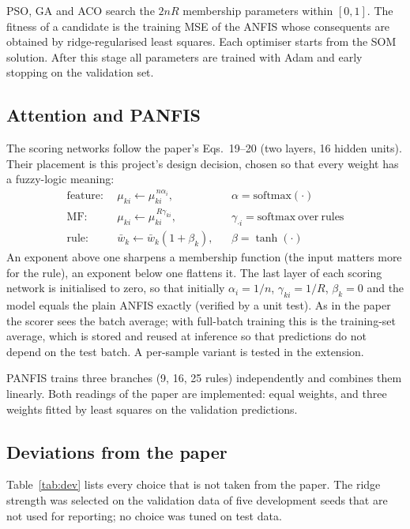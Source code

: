 \documentclass[conference]{IEEEtran}
\begin{document}
PSO, GA and ACO search the $2nR$ membership parameters within $[0,1]$. The fitness of a candidate is the training MSE of the ANFIS whose consequents are obtained by ridge-regularised least squares. Each optimiser starts from the SOM solution. After this stage all parameters are trained with Adam and early stopping on the validation set.

\subsection{Attention and PANFIS}
The scoring networks follow the paper's Eqs.~19--20 (two layers, 16 hidden units). Their placement is this project's design decision, chosen so that every weight has a fuzzy-logic meaning:
\begin{align}
\text{feature:}\ \ & \mu_{ki} \leftarrow \mu_{ki}^{\,n\alpha_i}, && \alpha=\mathrm{softmax}(\cdot) \nonumber\\
\text{MF:}\ \ & \mu_{ki} \leftarrow \mu_{ki}^{\,R\gamma_{ki}}, && \gamma_{\cdot i}=\mathrm{softmax\ over\ rules} \nonumber\\
\text{rule:}\ \ & \bar w_k \leftarrow \bar w_k(1+\beta_k), && \beta=\tanh(\cdot)
\end{align}
An exponent above one sharpens a membership function (the input matters more for the rule), an exponent below one flattens it. The last layer of each scoring network is initialised to zero, so that initially $\alpha_i=1/n$, $\gamma_{ki}=1/R$, $\beta_k=0$ and the model equals the plain ANFIS exactly (verified by a unit test). As in the paper the scorer sees the batch average; with full-batch training this is the training-set average, which is stored and reused at inference so that predictions do not depend on the test batch. A per-sample variant is tested in the extension.

PANFIS trains three branches (9, 16, 25 rules) independently and combines them linearly. Both readings of the paper are implemented: equal weights, and three weights fitted by least squares on the validation predictions.

\subsection{Deviations from the paper}
Table~\ref{tab:dev} lists every choice that is not taken from the paper. The ridge strength was selected on the validation data of five development seeds that are not used for reporting; no choice was tuned on test data.
\end{document}
